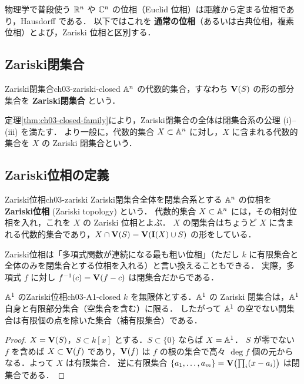 物理学で普段使う $\mathbb{R}^n$ や $\mathbb{C}^n$ の位相（Euclid 位相）は距離から定まる位相であり，Hausdorff である．
以下ではこれを \textbf{通常の位相}（あるいは古典位相，複素位相）とよび，Zariski 位相と区別する．

\subsection{Zariski閉集合}

\begin{mydef}{Zariski閉集合}{ch03-zariski-closed}
$\mathbb{A}^n$ の代数的集合，すなわち $\mathbf{V}(S)$ の形の部分集合を \textbf{Zariski閉集合} という．
\end{mydef}

定理\ref{thm:ch03-closed-family}により，Zariski閉集合の全体は閉集合系の公理 (i)--(iii) を満たす．
より一般に，代数的集合 $X\subset\mathbb{A}^n$ に対し，$X$ に含まれる代数的集合を $X$ の Zariski 閉集合という．

\subsection{Zariski位相の定義}

\begin{mydef}{Zariski位相}{ch03-zariski}
Zariski閉集合全体を閉集合系とする $\mathbb{A}^n$ の位相を \textbf{Zariski位相} (Zariski topology) という．
代数的集合 $X\subset\mathbb{A}^n$ には，その相対位相を入れ，これを $X$ の Zariski 位相とよぶ．
$X$ の閉集合はちょうど $X$ に含まれる代数的集合であり，$X\cap\mathbf{V}(S)=\mathbf{V}(\mathbf{I}(X)\cup S)$ の形をしている．
\end{mydef}

Zariski位相は「多項式関数が連続になる最も粗い位相」（ただし $k$ に有限集合と全体のみを閉集合とする位相を入れる）と言い換えることもできる．
実際，多項式 $f$ に対し $f^{-1}(c)=\mathbf{V}(f-c)$ は閉集合だからである．

\begin{myprop}{$\mathbb{A}^1$ のZariski位相}{ch03-A1-closed}
$k$ を無限体とする．$\mathbb{A}^1$ の Zariski 閉集合は，$\mathbb{A}^1$ 自身と有限部分集合（空集合を含む）に限る．
したがって $\mathbb{A}^1$ の空でない開集合は有限個の点を除いた集合（補有限集合）である．
\end{myprop}

\begin{proof}
$X=\mathbf{V}(S)$，$S\subset k[x]$ とする．$S\subset\{0\}$ ならば $X=\mathbb{A}^1$．
$S$ が零でない $f$ を含めば $X\subset\mathbf{V}(f)$ であり，$\mathbf{V}(f)$ は $f$ の根の集合で高々 $\deg f$ 個の元からなる．よって $X$ は有限集合．
逆に有限集合 $\{a_1,\dots,a_m\}=\mathbf{V}\bigl(\prod_i(x-a_i)\bigr)$ は閉集合である．
\end{proof}

